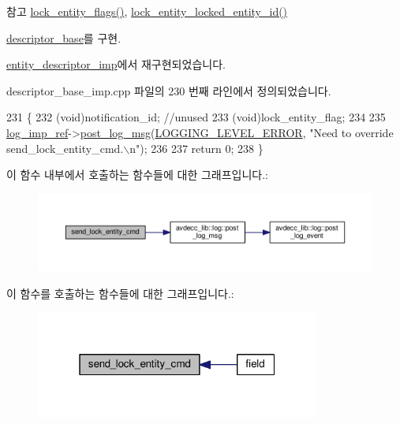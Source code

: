 \begin{DoxySeeAlso}{참고}
\hyperlink{classavdecc__lib_1_1descriptor__base__imp_afe2564a2a32f83deced28efa17f332e2}{lock\+\_\+entity\+\_\+flags()}, \hyperlink{classavdecc__lib_1_1descriptor__base__imp_aeb8f096d55f82522516cbf00a616246a}{lock\+\_\+entity\+\_\+locked\+\_\+entity\+\_\+id()} 
\end{DoxySeeAlso}


\hyperlink{classavdecc__lib_1_1descriptor__base_a1ac1f5c700f4eebd37b7c45498b36bbc}{descriptor\+\_\+base}를 구현.



\hyperlink{classavdecc__lib_1_1entity__descriptor__imp_a26fd66d8c409502eaa4dba47742ca7fa}{entity\+\_\+descriptor\+\_\+imp}에서 재구현되었습니다.



descriptor\+\_\+base\+\_\+imp.\+cpp 파일의 230 번째 라인에서 정의되었습니다.


\begin{DoxyCode}
231 \{
232     (void)notification\_id; \textcolor{comment}{//unused}
233     (void)lock\_entity\_flag;
234 
235     \hyperlink{namespaceavdecc__lib_acbe3e2a96ae6524943ca532c87a28529}{log\_imp\_ref}->\hyperlink{classavdecc__lib_1_1log_a68139a6297697e4ccebf36ccfd02e44a}{post\_log\_msg}(\hyperlink{namespaceavdecc__lib_a501055c431e6872ef46f252ad13f85cdaf2c4481208273451a6f5c7bb9770ec8a}{LOGGING\_LEVEL\_ERROR}, \textcolor{stringliteral}{"Need to
       override send\_lock\_entity\_cmd.\(\backslash\)n"});
236 
237     \textcolor{keywordflow}{return} 0;
238 \}
\end{DoxyCode}


이 함수 내부에서 호출하는 함수들에 대한 그래프입니다.\+:
\nopagebreak
\begin{figure}[H]
\begin{center}
\leavevmode
\includegraphics[width=350pt]{classavdecc__lib_1_1descriptor__base__imp_a26fd66d8c409502eaa4dba47742ca7fa_cgraph}
\end{center}
\end{figure}




이 함수를 호출하는 함수들에 대한 그래프입니다.\+:
\nopagebreak
\begin{figure}[H]
\begin{center}
\leavevmode
\includegraphics[width=265pt]{classavdecc__lib_1_1descriptor__base__imp_a26fd66d8c409502eaa4dba47742ca7fa_icgraph}
\end{center}
\end{figure}


